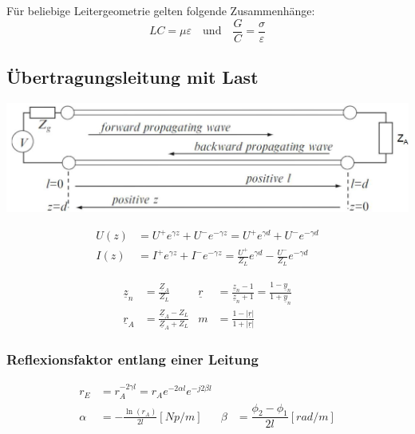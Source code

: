 Für beliebige Leitergeometrie gelten folgende Zusammenhänge:
\[
    LC = \mu\varepsilon \quad \text{und} \quad \frac{G}{C} = \frac{\sigma}{\varepsilon}
\]

\subsection{Übertragungsleitung mit Last}

\includegraphics[width=\columnwidth]{Figures/UebertragungleitungmitLast.png}

\vspace{2cm}



\begin{align*}
    U(z) & = U^+ e^{\gamma z} + U^- e^{-\gamma z} = U^+ e^{\gamma d} + U^ - e^{-\gamma d}                      \\
    I(z) & = I^+ e^{\gamma z} + I^- e^{-\gamma z} = \frac{U^+}{Z_L}e^{\gamma d} - \frac{U^-}{Z_L}e^{-\gamma d}
\end{align*}

\begin{align*}
    \underline{z}_n & = \frac{\underline{Z}_A}{Z_L}                     & \underline{r} & = \frac{\underline{z}_n-1}{\underline{z}_n+1}= \frac{1-\underline{y}_n}{1+\underline{y}_n} \\
    \underline{r}_A & = \frac{\underline{Z}_A-Z_L}{\underline{Z}_A+Z_L} & m             & = \frac{1-|\underline{r}|}{1+|\underline{r}|}
\end{align*}

\subsubsection{Reflexionsfaktor entlang einer Leitung}
\begin{align*}
    r_E    & = r_A  ^{-2\gamma l} = r_A  e^{-2\alpha l} e^{-j2\beta l}                                                     \\
    \alpha & = -\frac{\ln(r_A)}{2l} [\si{Np/m}]                        & \beta & = \dfrac{\phi_2 -\phi_1}{2l} [\si{rad/m}]
\end{align*}

